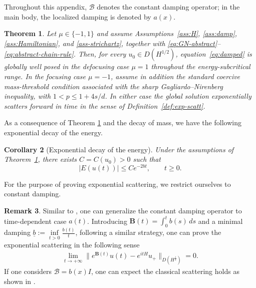 \documentclass[10pt%
]{amsart}
\numberwithin{equation}{section}
\newtheorem{theorem}{Theorem}[section]
\newtheorem{corollary}[theorem]{Corollary}
\theoremstyle{definition}
\newtheorem{remark}[theorem]{Remark}
\begin{document}
	Throughout this appendix, $\mathcal B$ denotes the constant damping operator; in the main body, the localized damping is denoted by $a(x)$.
	\begin{theorem}\label{thm-abstract}
		Let $\mu\in\{-1,1\}$ and assume Assumptions~\ref{ass:H}, \ref{ass:damp}, \ref{ass:Hamiltonian}, and \ref{ass-strichartz}, together with \eqref{eq:GN-abstract}--\eqref{eq:abstract-chain-rule}. Then, for every $u_0\in D(H^{1/2})$, equation~\eqref{eq:damped} is globally well posed in the defocusing case $\mu=1$ throughout the energy-subcritical range. In the focusing case $\mu=-1$, assume in addition the standard coercive mass-threshold condition associated with the sharp Gagliardo--Nirenberg inequality, with $1<p\le1+4s/d$. In either case the global solution exponentially scatters forward in time in the sense of Definition~\ref{def:exp-scatt}.
	\end{theorem}
	As a consequence of Theorem \ref{thm-abstract} and the decay of mass, we have the following exponential decay of the energy.
	\begin{corollary}[Exponential decay of the energy]\label{lem:energy-exp-decay}
		Under the assumptions of Theorem~\ref{thm-abstract}, there exists $C=C(u_0)>0$ such that
		\begin{equation}\label{eq:energy-exp-decay}
			|E(u(t))|\le C e^{-2bt},
			\qquad t\ge0.
		\end{equation}
	\end{corollary}
	
	
	For the purpose of proving exponential scattering, we restrict ourselves
			to constant damping.
	
	
	
	\begin{remark}
		
		Similar to \cite{Saanouni}, one can generalize the constant damping operator to time-dependent case $a(t)$. Introducing $\mathbf B(t)=\int_0^tb(s)\,ds$ and a minimal damping $\underline{b}:=\inf\limits_{t>0}\frac{b(t)}{t}$, following a similar strategy, one can prove the exponential scattering in the following sense 
		\begin{align*}
			\lim_{t\to+\infty}\big\|e^{\mathbf B(t)}u(t)-e^{itH}u_+\big\|_{D(H^\frac12)}=0.
		\end{align*}
		If one considers $\mathcal B=b(x)I$, one can  expect the classical scattering holds as shown in \cite{LS25}. 
	\end{remark}
\end{document}
